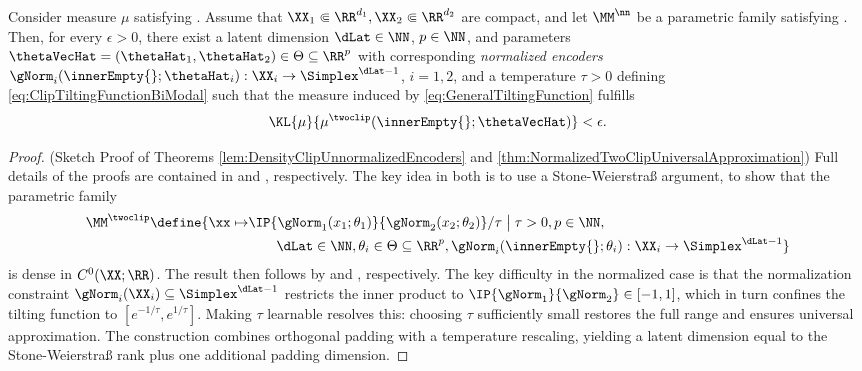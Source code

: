 \documentclass{article}
\begin{document}
\begin{theorem}\leavevmode
 \label{thm:NormalizedTwoClipUniversalApproximation}
 Consider measure $\mu$ satisfying .
 Assume that $\XX_1 \Subset \RR^{d_1}, \XX_2 \Subset \RR^{d_2}$ are compact, and
 let $\MM^\nn$ be a parametric family satisfying
 .
 Then, for every $\epsilon > 0$, there exist a latent dimension $\dLat \in
  \NN$, $p\in\NN$, and parameters $\thetaVecHat = (\thetaHat_1, \thetaHat_2) \in \Theta \subseteq \RR^p$
 with corresponding \emph{normalized encoders}
 $\gNorm_i(\innerEmpty{};\thetaHat_i) : \XX_i \to \Simplex^{\dLat - 1}$,
 $i=1,2$, and a temperature $\tau > 0$ defining
 \eqref{eq:ClipTiltingFunctionBiModal} such that the measure induced by
 \eqref{eq:GeneralTiltingFunction} fulfills
 \begin{align*}
  \KL{\mu}{\mu^{\twoclip}(\innerEmpty{};\thetaVecHat)} < \epsilon.
 \end{align*}
\end{theorem}
\begin{proof}
 (Sketch Proof of Theorems \ref{lem:DensityClipUnnormalizedEncoders}
 and \ref{thm:NormalizedTwoClipUniversalApproximation})
 Full details of the proofs are contained in
  and
 , respectively.
 The key idea in both is to use a Stone-Weierstraß argument, to
 show that the parametric family
 \begin{align*}
  \MM^{\twoclip} \define  \{\xx \mapsto
   & \IP{\gNorm_1(x_1;\theta_1)}{\gNorm_2(x_2;\theta_2)}
  / \tau \;\big\vert\; \tau > 0, p\in \NN,                      \\
   & \qquad \dLat \in \NN, \theta_i \in \Theta \subseteq \RR^p,
  \gNorm_i(\innerEmpty{};\theta_i): \XX_i
  \to \Simplex^{\dLat -1}\}
 \end{align*}
 is dense in $C^0(\XX;\RR)$. The result then follows by
  and
 , respectively.
 The key difficulty in the normalized case is
 that the normalization constraint $\gNorm_i(\XX_i) \subseteq
  \Simplex^{\dLat - 1}$ restricts the inner product to
 $\IP{\gNorm_1}{\gNorm_2} \in [-1, 1]$, which in turn confines the tilting
 function to $[e^{-1/\tau}, e^{1/\tau}]$. Making $\tau$ learnable resolves
 this: choosing $\tau$ sufficiently small restores the full range and
 ensures universal approximation. The construction combines orthogonal
 padding with a temperature rescaling, yielding a latent dimension equal to
 the Stone-Weierstraß rank plus one additional padding dimension.
\end{proof}
\end{document}
